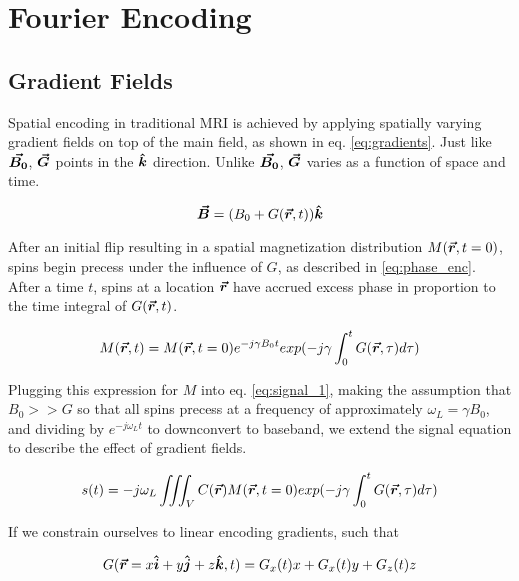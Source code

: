 \section{Fourier Encoding}

\subsection{Gradient Fields}
Spatial encoding in traditional MRI is achieved by applying spatially varying gradient fields on top of the main field,
as shown in eq. \ref{eq:gradients}. Just like $\bm{\vec{B_0}}$, $\bm{\vec{G}}$ points in the $\bm{\hat{k}}$ direction. Unlike
$\bm{\vec{B_0}}$, $\bm{\vec{G}}$ varies as a function of space and time.

\begin{equation}\label{eq:gradients}
    \bm{\vec{B}} = (B_0 + G(\bm{\vec{r}},t))\bm{\hat{k}}
\end{equation}

After an initial flip resulting in a spatial magnetization distribution $M(\bm{\vec{r}},t=0)$, spins begin precess under the
influence of $G$, as described in \ref{eq:phase_enc}. After a time $t$, spins at a location $\bm{\vec{r}}$ have accrued
excess phase in proportion to the time integral of $G(\bm{\vec{r}},t)$.

\begin{equation}\label{eq:phase_enc}
    M(\bm{\vec{r}},t) = M(\bm{\vec{r}},t=0) e^{-j \gamma B_0 t} exp(-j \gamma \int_0^t G(\bm{\vec{r}},\tau) d \tau)
\end{equation}

Plugging this expression for $M$ into eq. \ref{eq:signal_1}, making the assumption that $B_0 >> G$ so that all spins
precess at a frequency of approximately $\omega_L = \gamma B_0$, and dividing by $e^{-j \omega_L t}$ to downconvert to
baseband, we extend the signal equation to describe the effect of gradient fields.

\begin{equation}\label{signal_2}
    s(t) = - j \omega_L \iiint_V C(\bm{\vec{r}}) M(\bm{\vec{r}},t=0) exp(-j \gamma \int_0^t G(\bm{\vec{r}},\tau)
    d\tau)
\end{equation}

If we constrain ourselves to linear encoding gradients, such that

\begin{equation}\label{linear_gradient}
    G(\bm{\vec{r}}=x\bm{\hat{i}} + y\bm{\hat{j}} + z\bm{\hat{k}},t) = G_x(t) x + G_x(t) y + G_z(t) z 
\end{equation}

